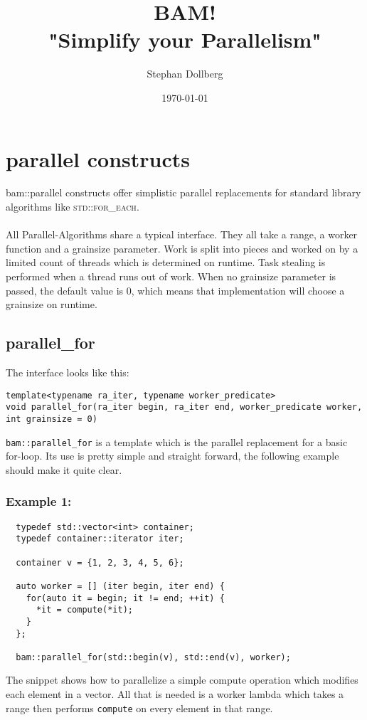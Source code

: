 \documentclass[11pt, a4paper]{article}
\begin{document}
\title{\bf\color{DarkOrchid}BAM!\\
\bf"Simplify your Parallelism"
 }
\author{Stephan Dollberg}
\date{\today}
\maketitle

\section{parallel constructs}
bam::parallel constructs offer simplistic parallel replacements for standard library algorithms like \textsc{std::for\_each}.
\\\\All Parallel-Algorithms share a typical interface. They all take a range, a worker function and a grainsize parameter. 
Work is split into pieces and worked on by a limited count of threads which is determined on runtime. Task stealing is performed when a thread runs out of work. When no grainsize parameter is passed, the default value is 0, which means that implementation will choose a grainsize on runtime.

\subsection{parallel\_for}

The interface looks like this:

\begin{lstlisting} 
template<typename ra_iter, typename worker_predicate>
void parallel_for(ra_iter begin, ra_iter end, worker_predicate worker, int grainsize = 0)
\end{lstlisting}
\texttt{bam::parallel\_for} is a template which is the parallel replacement for a basic for-loop. Its use is pretty simple and straight forward, the following example should make it quite clear.

\subsubsection{Example 1: }

\begin{lstlisting} 
  typedef std::vector<int> container;
  typedef container::iterator iter;

  container v = {1, 2, 3, 4, 5, 6};

  auto worker = [] (iter begin, iter end) {
    for(auto it = begin; it != end; ++it) {
      *it = compute(*it);
    }
  };

  bam::parallel_for(std::begin(v), std::end(v), worker);
\end{lstlisting}
The snippet shows how to parallelize a simple compute operation which modifies each element in a vector. All that is needed is a worker lambda which takes a range then performs \texttt{compute} on every element in that range. 
\end{document}
